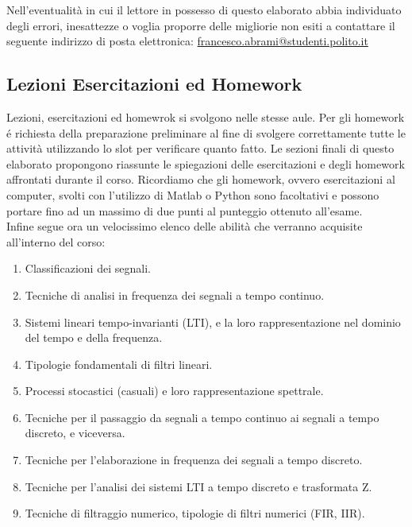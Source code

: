 \documentclass[../main.tex]{subfiles}
\begin{document}
 
Nell'eventualità in cui il lettore in possesso di questo elaborato abbia individuato degli errori, inesattezze o voglia proporre delle migliorie non esiti a contattare il seguente indirizzo di posta elettronica: \href{mailto:francesco.abrami@studenti.polito.it?subject=Teoria ed Elaborazione dei Segnali - 02MOOOA&body= Buongiorno, 
scrivo riguardo al documento LaTex del corso di cui in oggetto.}{francesco.abrami@studenti.polito.it}

\subsection{Lezioni Esercitazioni ed Homework}

Lezioni, esercitazioni ed homewrok si svolgono nelle stesse aule.
Per gli homework é richiesta della preparazione preliminare al fine di svolgere correttamente tutte le attività utilizzando lo slot per verificare quanto fatto. Le sezioni finali di questo elaborato propongono riassunte le spiegazioni delle esercitazioni e degli homework affrontati durante il corso.
Ricordiamo che gli homework, ovvero esercitazioni al computer, svolti con l'utilizzo di Matlab o Python sono facoltativi e possono portare fino ad un massimo di due punti al punteggio ottenuto all'esame.\\

Infine segue ora un velocissimo elenco delle abilità che verranno acquisite all'interno del corso:

\begin{enumerate}
	\item[-] Classificazioni dei segnali.
	\item[-] Tecniche di analisi in frequenza dei segnali a tempo continuo.
	\item[-] Sistemi lineari tempo-invarianti (LTI), e la loro rappresentazione nel dominio del tempo e della frequenza.
	\item[-] Tipologie fondamentali di filtri lineari.
	\item[-] Processi stocastici (casuali) e loro rappresentazione spettrale.
	\item[-] Tecniche per il passaggio da segnali a tempo continuo ai segnali a tempo discreto, e viceversa.
	\item[-] Tecniche per l’elaborazione in frequenza dei segnali a tempo discreto.
	\item[-] Tecniche per l'analisi dei sistemi LTI a tempo discreto e trasformata Z.
	\item[-] Tecniche di filtraggio numerico, tipologie di filtri numerici (FIR, IIR).
\end{enumerate}
\end{document}
